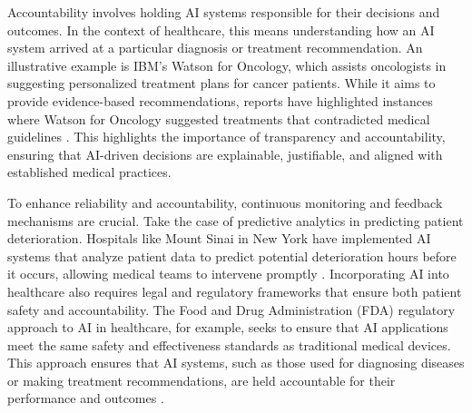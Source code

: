 \documentclass{article}
\begin{document}
Accountability involves holding AI systems responsible for their decisions and outcomes. In the context of healthcare, this means understanding how an AI system arrived at a particular diagnosis or treatment recommendation. An illustrative example is IBM's Watson for Oncology, which assists oncologists in suggesting personalized treatment plans for cancer patients. While it aims to provide evidence-based recommendations, reports have highlighted instances where Watson for Oncology suggested treatments that contradicted medical guidelines \cite{smith2021clinical}. This highlights the importance of transparency and accountability, ensuring that AI-driven decisions are explainable, justifiable, and aligned with established medical practices.

To enhance reliability and accountability, continuous monitoring and feedback mechanisms are crucial. Take the case of predictive analytics in predicting patient deterioration. Hospitals like Mount Sinai in New York have implemented AI systems that analyze patient data to predict potential deterioration hours before it occurs, allowing medical teams to intervene promptly \cite{mehta2022}. Incorporating AI into healthcare also requires legal and regulatory frameworks that ensure both patient safety and accountability. The Food and Drug Administration (FDA) regulatory approach to AI in healthcare, for example, seeks to ensure that AI applications meet the same safety and effectiveness standards as traditional medical devices. This approach ensures that AI systems, such as those used for diagnosing diseases or making treatment recommendations, are held accountable for their performance and outcomes  \cite{lyell2021machine}.
\end{document}
